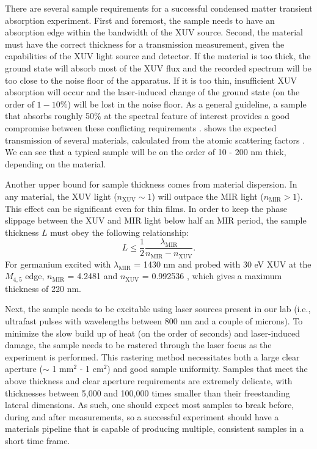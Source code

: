 There are several sample requirements for a successful condensed matter transient absorption experiment. First and foremost, the sample needs to have an absorption edge within the bandwidth of the XUV source. Second, the material must have the correct thickness for a transmission measurement, given the capabilities of the XUV light source and detector. If the material is too thick, the ground state will absorb most of the XUV flux and the recorded spectrum will be too close to the noise floor of the apparatus. If it is too thin, insufficient XUV absorption will occur and the laser-induced change of the ground state (on the order of $1-10\%$) will be lost in the noise floor. As a general guideline, a sample that absorbs roughly 50\% at the spectral feature of interest provides a good compromise between these conflicting requirements \cite{geneauxTransientAbsorptionSpectroscopy2019}.  shows the expected transmission of several materials, calculated from the atomic scattering factors \cite{gulliksonCXROXRayInteractions}. We can see that a typical sample will be on the order of 10 - 200 nm thick, depending on the material.

Another upper bound for sample thickness comes from material dispersion. In any material, the XUV light ($n_{\text{XUV}} \sim 1$) will outpace the MIR light ($n_{\text{MIR}} > 1$). This effect can be significant even for thin films. In order to keep the phase slippage between the XUV and MIR light below half an MIR period, the sample thickness $L$ must obey the following relationship:
\begin{equation}
L \le \frac{1}{2} \frac{\lambda_{\text{MIR}}}{n_{\text{MIR}} - n_{\text{XUV}}}.
\end{equation}
For germanium excited with $\lambda_{\text{MIR}}$ = 1430 nm and probed with 30 eV XUV at the $M_{4,5}$ edge, $n_{\text{MIR}}$ = 4.2481 \cite{nunleyOpticalConstantsGermanium2016} and $n_{\text{XUV}}$ = 0.992536 \cite{gulliksonCXROXRayInteractions}, which gives a maximum thickness of 220 nm.

Next, the sample needs to be excitable using laser sources present in our lab (i.e., ultrafast pulses with wavelengths between 800 nm and a couple of microns). To minimize the slow build up of heat (on the order of seconds) and laser-induced damage, the sample needs to be rastered through the laser focus as the experiment is performed. This rastering method necessitates both a large clear aperture ($\sim$ 1 mm$^2$ - 1 cm$^2$) and good sample uniformity. Samples that meet the above thickness and clear aperture requirements are extremely delicate, with thicknesses between 5,000 and 100,000 times smaller than their freestanding lateral dimensions. As such, one should expect most samples to break before, during and after measurements, so a successful experiment should have a materials pipeline that is capable of producing multiple, consistent samples in a short time frame.

